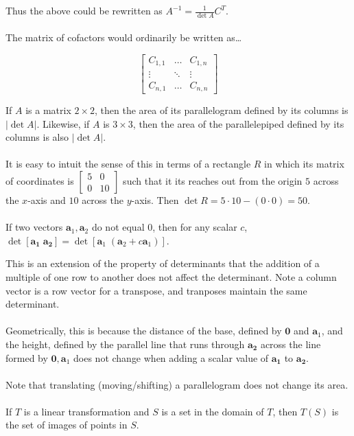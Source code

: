 \documentclass[12pt]{article}
\newcommand{\bm}[1]{\mathbf{{#1}}}
\newcommand{\mb}{\begin{bmatrix}}
\newcommand{\me}{\end{bmatrix}}
\begin{document}
Thus the above could be rewritten as $A^{-1} = \frac{1}{\det A} C^{T}$. \\ \\

The matrix of cofactors would ordinarily be written as\dots

$$
\mb
C_{1,1} & \dots & C_{1,n} \\
\vdots & \ddots & \vdots \\
C_{n,1} & \dots & C_{n,n}
\me
$$

If $A$ is a matrix $2 \times 2$, then the area of its parallelogram defined by its columns is $|\det A|$. Likewise, if $A$ is
$3 \times 3$, then the area of the parallelepiped defined by its columns is also $|\det A|$. \\ \\

It is easy to intuit the sense of this in terms of a rectangle $R$ in which its matrix of coordinates is $\mb 5 & 0 \\ 0 & 10 \me$
such that it its reaches out from the origin $5$ across the $x$-axis and $10$ across the $y$-axis. Then
$\det R = 5 \cdot 10 - (0 \cdot 0) = 50$. \\ \\

If two vectors $\bm{a}_1, \bm{a}_2$ do not equal 0, then for any scalar $c$, $\det [\bm{a_1 \; a_2}] = \det [\bm{a}_1 \; (\bm{a}_2 + c\bm{a}_1)]$.

This is an extension of the property of determinants that the addition of a multiple of one row to another does not affect the determinant. Note a column vector is a row vector for a transpose, and tranposes maintain the same determinant. \\ \\

Geometrically, this is because the distance of the base, defined by $\bm{0}$ and $\bm{a}_1$, and the height, defined by the parallel line that
runs through $\bm{a_2}$ across the line formed by $\bm{0}, \bm{a}_1$ does not change when adding a scalar value of $\bm{a_1}$ to $\bm{a_2}$. \\ \\

Note that translating (moving/shifting) a parallelogram does not change its area. \\ \\

If $T$ is a linear transformation and $S$ is a set in the domain of $T$, then $T(S)$ is the set of images of points in $S$. \\ \\
\end{document}
